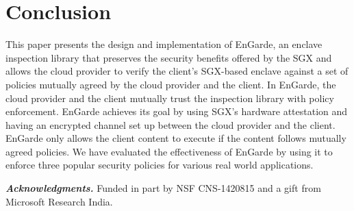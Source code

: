 \documentclass[conference,compsoc]{IEEEtran}
\newcommand{\myparagraph}[1]{\parskip -4pt \indent\par\noindent\textbf{\textit{#1}} \parskip 0pt}
\begin{document}
%

\section{Conclusion}
\label{section:conclusion}
This paper presents the design and implementation of EnGarde, an enclave inspection library 
that preserves the security benefits offered by the SGX and allows the cloud provider to 
verify the client's SGX-based enclave against a set of policies mutually agreed by the 
cloud provider and the client. In EnGarde, the cloud provider and the client mutually trust 
the inspection library with policy enforcement. EnGarde achieves its goal by using SGX's 
hardware attestation and having an encrypted channel set up between the cloud provider 
and the client. EnGarde only allows the client content to execute if the content follows
mutually agreed policies. We have evaluated the effectiveness of EnGarde by using it to
enforce three popular security policies for various real world applications.



\myparagraph{Acknowledgments.} Funded in part by NSF CNS-1420815 and a 
gift from Microsoft Research India.

\scriptsize


\end{document}
